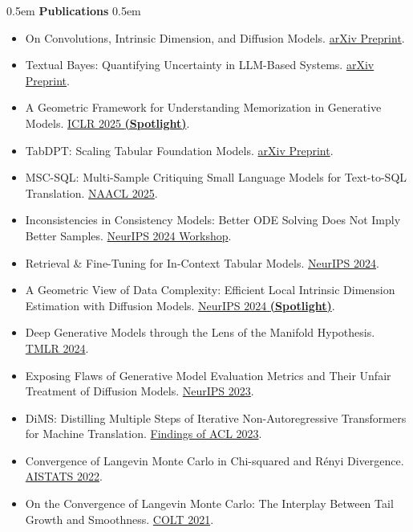 \documentclass[11pt,a4paper]{article}
\newcommand{\cvsection}[1]{%
    \vspace{10pt}
    \noindent\hfill\kern0.5em
    {\Huge \textbf{\textcolor{maincolor}{#1}}}%
    \kern0.5em\hfill\vspace{8pt}
}
\begin{document}
\cvsection{Publications}
\begin{itemize}[noitemsep, topsep=4pt, leftmargin=0em, label=\textcolor{maincolorlight}{$\circ$}]
    \item On Convolutions, Intrinsic Dimension, and Diffusion Models. {\textcolor{venuecolor}{\href{https://arxiv.org/abs/2506.20705}{arXiv Preprint}}}.
    \item Textual Bayes: Quantifying Uncertainty in LLM-Based Systems. {\textcolor{venuecolor}{\href{https://arxiv.org/abs/2506.10060}{arXiv Preprint}}}.
    \item A Geometric Framework for Understanding Memorization in Generative Models. {\textcolor{venuecolor}{\href{https://arxiv.org/abs/2411.00113}{ICLR 2025 \textbf{(Spotlight)}}}}.
    \item TabDPT: Scaling Tabular Foundation Models. {\textcolor{venuecolor}{\href{https://arxiv.org/abs/2410.18164}{arXiv Preprint}}}.
    \item MSC-SQL: Multi-Sample Critiquing Small Language Models for Text-to-SQL Translation. {\textcolor{venuecolor}{\href{https://aclanthology.org/2025.naacl-long.107/}{NAACL 2025}}}.
    \item Inconsistencies in Consistency Models: Better ODE Solving Does Not Imply Better Samples. {\textcolor{venuecolor}{\href{https://openreview.net/forum?id=2p4ES8QPUi}{NeurIPS 2024 Workshop}}}.
    \item Retrieval \& Fine-Tuning for In-Context Tabular Models. {\textcolor{venuecolor}{\href{https://proceedings.neurips.cc/paper_files/paper/2024/hash/c40daf14d7a6469e65116507c21faeb7-Abstract-Conference.html}{NeurIPS 2024}}}.
    \item A Geometric View of Data Complexity: Efficient Local Intrinsic Dimension Estimation with Diffusion Models. {\textcolor{venuecolor}{\href{https://proceedings.neurips.cc/paper_files/paper/2024/hash/43ab1646052dab79731f5d70bf40f6dc-Abstract-Conference.html}{NeurIPS 2024 \textbf{(Spotlight)}}}}.
    \item Deep Generative Models through the Lens of the Manifold Hypothesis. {\textcolor{venuecolor}{\href{https://openreview.net/forum?id=a90WpmSi0I}{TMLR 2024}}}.
    \item Exposing Flaws of Generative Model Evaluation Metrics and Their Unfair Treatment of Diffusion Models. {\textcolor{venuecolor}{\href{https://papers.nips.cc/paper_files/paper/2023/hash/0bc795afae289ed465a65a3b4b1f4eb7-Abstract-Conference.html}{NeurIPS 2023}}}.
    \item DiMS: Distilling Multiple Steps of Iterative Non-Autoregressive Transformers for Machine Translation. {\textcolor{venuecolor}{\href{https://aclanthology.org/2023.findings-acl.542}{Findings of ACL 2023}}}.
    \item Convergence of Langevin Monte Carlo in Chi-squared and R\'enyi Divergence. {\textcolor{venuecolor}{\href{https://proceedings.mlr.press/v151/erdogdu22a.html}{AISTATS 2022}}}.
    \item On the Convergence of Langevin Monte Carlo: The Interplay Between Tail Growth and Smoothness. {\textcolor{venuecolor}{\href{https://proceedings.mlr.press/v134/erdogdu21a.html}{COLT 2021}}}.
\end{itemize}
\end{document}
